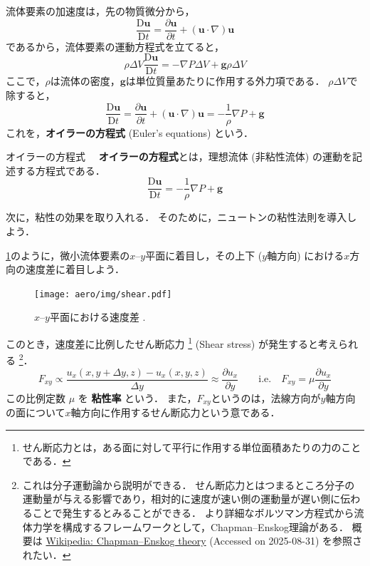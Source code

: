 \documentclass[uplatex,dvipdfmx,a4j,11pt]{jsreport}
\newcommand{\keyword}[1]{\textcolor{mainblue}{\textbf{#1}}}
\newcommand{\Diff}{\mathrm{D}} %
\numberwithin{equation}{chapter}
\begin{document}
流体要素の加速度は，先の物質微分から，
\begin{equation*}
  \frac{\Diff \mathbf{u}}{\Diff t} = \frac{\partial \mathbf{u}}{\partial t} + (\mathbf{u}\cdot \nabla)\mathbf{u}
\end{equation*}
であるから，流体要素の運動方程式を立てると，
\begin{equation}
  \rho \Delta V \frac{\Diff \mathbf{u}}{\Diff t} = -\nabla P \Delta V + \mathbf{g} \rho \Delta V
  \label{eq:euler_intermediate}
\end{equation}
ここで，$\rho$は流体の密度，$\mathbf{g}$は単位質量あたりに作用する外力項である．
$\rho \Delta V$で除すると，
\begin{equation}
  \frac{\Diff \mathbf{u}}{\Diff t} = \frac{\partial \mathbf{u}}{\partial t} + (\mathbf{u}\cdot \nabla)\mathbf{u} = -\frac{1}{\rho} \nabla P + \mathbf{g}
\end{equation}
これを，\keyword{オイラーの方程式} (Euler's equations) という．

\begin{definition}{オイラーの方程式}{}{}
    　\keyword{オイラーの方程式}とは，理想流体 (非粘性流体) の運動を記述する方程式である．
   \begin{equation}
     \frac{\Diff \mathbf{u}}{\Diff t} = -\frac{1}{\rho} \nabla P + \mathbf{g}
   \end{equation}
\end{definition}

\enskip

次に，粘性の効果を取り入れる．
そのために，ニュートンの粘性法則を導入しよう．

\cref{fig:shear}のように，微小流体要素の$x$--$y$平面に着目し，その上下 ($y$軸方向) における$x$方向の速度差に着目しよう．
\begin{figure}[H]
  \centering
  \texttt{[image: aero/img/shear.pdf]}
  \caption{$x$--$y$平面における速度差 .}
  \label{fig:shear}
\end{figure}
このとき，速度差に比例したせん断応力
\footnote{せん断応力とは，ある面に対して平行に作用する単位面積あたりの力のことである．}
 (Shear stress) が発生すると考えられる
\footnote{
  これは分子運動論から説明ができる．
  せん断応力とはつまるところ分子の運動量が与える影響であり，相対的に速度が速い側の運動量が遅い側に伝わることで発生するとみることができる．
  より詳細なボルツマン方程式から流体力学を構成するフレームワークとして，Chapman--Enskog理論がある．
  概要は \href{https://en.wikipedia.org/wiki/Chapman\%e2\%80\%93Enskog_theory}{Wikipedia: Chapman--Enskog theory} (Accessed on 2025-08-31) を参照されたい．
}．
\begin{equation*}
  F_{xy} \propto \frac{u_x(x, y + \Delta y, z) - u_x(x, y, z)}{\Delta y} \approx \frac{\partial u_x}{\partial y}\qquad
  \text{i.e.}\quad  F_{xy} = \mu \frac{\partial u_x}{\partial y}
\end{equation*}
この比例定数 $\mu$ を \keyword{粘性率} という．
また，$F_{xy}$というのは，法線方向が$y$軸方向の面について$x$軸方向に作用するせん断応力という意である．
\end{document}
